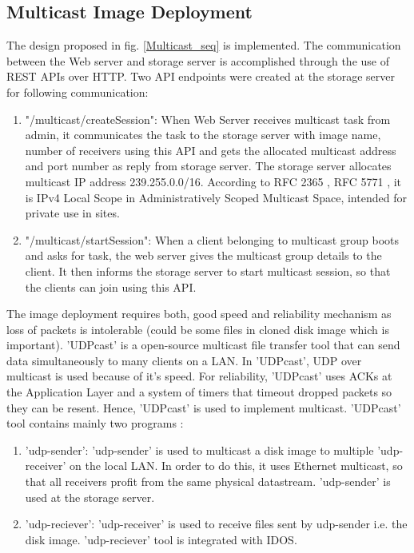 \documentclass[a4paper,12pt]{article}
\begin{document}
\subsection{ Multicast Image Deployment}
The design proposed in fig. \ref{Multicast_seq} is implemented. The communication between the Web server and storage server is accomplished through the use of REST APIs over HTTP. Two API endpoints were created at the storage server for following communication:
\begin{enumerate}[label=\roman*.]
    \item "/multicast/createSession": When Web Server receives multicast task from admin, it communicates the task to the storage server with image name, number of receivers using this API and gets the allocated multicast address and port number as reply from storage server. The storage server allocates multicast IP address  239.255.0.0/16. According to RFC 2365 \cite{2365}, RFC 5771 \cite{5771}, it is IPv4 Local Scope in Administratively Scoped Multicast Space, intended for private use in sites. 
    \item "/multicast/startSession": When a client belonging to multicast group boots and asks for task, the web server gives the multicast group details to the client. It then informs the storage server to start multicast session, so that the clients can join using this API.
\end{enumerate}

The image deployment requires both, good speed and reliability mechanism as loss of packets is intolerable (could be some files in cloned disk image which is important). 'UDPcast' \cite{udpcast} is a open-source multicast file transfer tool that can send data simultaneously to many clients on a LAN. In 'UDPcast', UDP over multicast is used because of it’s speed. For reliability, 'UDPcast' uses ACKs at the Application Layer and a system of timers that timeout dropped packets so they can be resent. Hence, 'UDPcast' is used to implement multicast. 
'UDPcast' tool contains mainly two programs :
\begin{enumerate}[label=\roman*.]

    \item 'udp-sender': 'udp-sender' is used to multicast a disk image to multiple 'udp-receiver' on the local LAN. In order to do this, it uses Ethernet multicast, so that all receivers profit from the same physical datastream. 'udp-sender' is used at the storage server.
    \item 'udp-reciever': 'udp-receiver' is used to receive files sent by udp-sender i.e. the disk image. 'udp-reciever' tool is integrated with IDOS. 
\end{enumerate}
\end{document}
